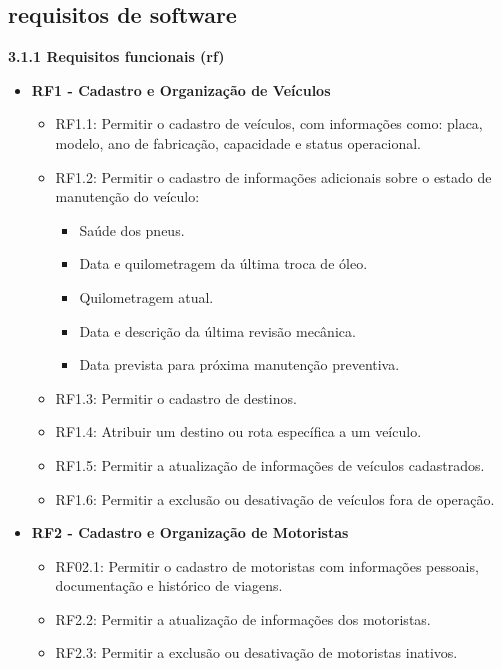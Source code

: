 \documentclass[12pt]{article}
\begin{document}
\subsection{requisitos de software}
   \textbf{3.1.1 Requisitos funcionais (rf)}
\begin{itemize}
    \item \textbf{RF1 - Cadastro e Organização de Veículos}
    \begin{itemize}
        \item RF1.1: Permitir o cadastro de veículos, com informações como: placa, modelo, ano de fabricação, capacidade e status operacional.
        \item RF1.2: Permitir o cadastro de informações adicionais sobre o estado de manutenção do veículo:
        \begin{itemize}
            \item Saúde dos pneus.
            \item Data e quilometragem da última troca de óleo.
            \item Quilometragem atual.
            \item Data e descrição da última revisão mecânica.
            \item Data prevista para próxima manutenção preventiva.
        \end{itemize}
        \item RF1.3: Permitir o cadastro de destinos.
        \item RF1.4: Atribuir um destino ou rota específica a um veículo.
        \item RF1.5: Permitir a atualização de informações de veículos cadastrados.
        \item RF1.6: Permitir a exclusão ou desativação de veículos fora de operação.
    \end{itemize}

    \item \textbf{RF2 - Cadastro e Organização de Motoristas}

    \begin{itemize}
        \item RF02.1: Permitir o cadastro de motoristas com informações pessoais, documentação e histórico de viagens.
        \item RF2.2: Permitir a atualização de informações dos motoristas.
        \item RF2.3: Permitir a exclusão ou desativação de motoristas inativos.
    \end{itemize}


\end{itemize}
\end{document}
